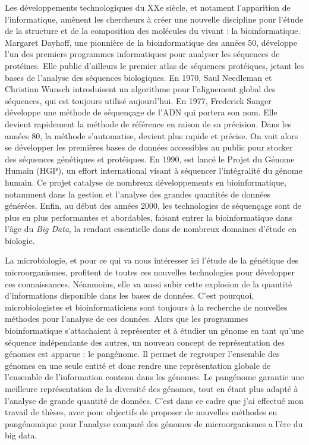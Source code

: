 Les développements technologiques du XXe siècle, et notament l'apparition de l'informatique, amènent les chercheurs à créer une nouvelle discipline pour l'étude de la structure et de la composition des molécules du vivant : la bioinformatique. Margaret Dayhoff, une pionnière de la bioinformatique des années 50, développe l'un des premiers programmes informatiques pour analyser les séquences de protéines. Elle publie d'ailleurs le premier atlas de séquences protéiques, jetant les bases de l'analyse des séquences biologiques. En 1970, Saul Needleman et Christian Wunsch introduisent un algorithme pour l'alignement global des séquences, qui est toujours utilisé aujourd'hui. En 1977, Frederick Sanger développe une méthode de séquençage de l'ADN qui portera son nom. Elle devient rapidement la méthode de référence en raison de sa précision. Dans les années 80, la méthode s'automatise, devient plus rapide et précise. On voit alors se développer les premières bases de données accessibles au public pour stocker des séquences génétiques et protéiques. En 1990, est lancé le Projet du Génome Humain (HGP), un effort international visant à séquencer l'intégralité du génome humain. Ce projet catalyse de nombreux développements en bioinformatique, notamment dans la gestion et l'analyse des grandes quantités de données générées. Enfin, au début des années 2000, les technologies de séquençage sont de plus en plus performantes et abordables, faisant entrer la bioinformatique dans l'âge du \textit{Big Data}, la rendant essentielle dans de nombreux domaines d'étude en biologie.


La microbiologie, et pour ce qui va nous intéresser ici l'étude de la génétique des microorganismes, profitent de toutes ces nouvelles technologies pour développer ces connaissances. Néanmoins, elle va aussi subir cette explosion de la quantité d'informations disponible dans les bases de données. C'est pourquoi, microbiologistes et bioinformaticiens sont toujours à la recherche de nouvelles méthodes pour l'analyse de ces données. Alors que les programmes bioinformatique s'attachaient à représenter et à étudier un génome en tant qu'une séquence indépendante des autres, un nouveau concept de représentation des génomes est apparue : le pangénome. Il permet de regrouper l'ensemble des génomes en une seule entité et donc rendre une représentation globale de l'ensemble de l'information contenu dans les génomes. Le pangénome garantie une meilleure représentation de la diversité des génomes, tout en étant plus adapté à l'analyse de grande quantité de données. C'est dans ce cadre que j'ai effectué mon travail de thèses, avec pour objectifs de proposer de nouvelles méthodes en pangénomique pour l'analyse comparé des génomes de microorganismes a l'ère du big data.
\newline

